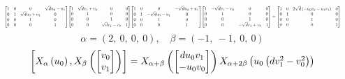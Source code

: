 \documentclass[11pt]{article}
\theoremstyle{definition}
\begin{document}
\[
\scaletoalign{\textwidth}{{\left[\begin{matrix}1 & 0 & 0 & \sqrt{d} u_{0} - u_{1}\\0 & 1 & \sqrt{d} u_{0} + u_{1} & 0\\0 & 0 & 1 & 0\\0 & 0 & 0 & 1\end{matrix}\right]} {\left[\begin{matrix}1 & \sqrt{d} v_{1} + v_{0} & 0 & 0\\0 & 1 & 0 & 0\\0 & 0 & 1 & 0\\0 & 0 & \sqrt{d} v_{1} - v_{0} & 1\end{matrix}\right]} {\left[\begin{matrix}1 & 0 & 0 & - \sqrt{d} u_{0} + u_{1}\\0 & 1 & - \sqrt{d} u_{0} - u_{1} & 0\\0 & 0 & 1 & 0\\0 & 0 & 0 & 1\end{matrix}\right]} {\left[\begin{matrix}1 & - \sqrt{d} v_{1} - v_{0} & 0 & 0\\0 & 1 & 0 & 0\\0 & 0 & 1 & 0\\0 & 0 & - \sqrt{d} v_{1} + v_{0} & 1\end{matrix}\right]} = {\left[\begin{matrix}1 & 0 & 2 \sqrt{d} \left(- u_{0} v_{0} - u_{1} v_{1}\right) & 0\\0 & 1 & 0 & 0\\0 & 0 & 1 & 0\\0 & 0 & 0 & 1\end{matrix}\right]}}
\]
\[
\alpha = \left( 2, \  0, \  0, \  0\right), \quad \beta = \left( -1, \  -1, \  0, \  0\right)
\]
\[
\scaletoalign{\textwidth}{\left[ X_{\alpha}\left(u_{0}\right), X_{\beta}\left(\left[\begin{matrix}v_{0}\\v_{1}\end{matrix}\right]\right) \right] = X_{\alpha + \beta}\left(\left[\begin{matrix}d u_{0} v_{1}\\- u_{0} v_{0}\end{matrix}\right]\right) X_{\alpha + 2\beta}\left(u_{0} \left(d v_{1}^{2} - v_{0}^{2}\right)\right)}
\]
\end{document}
